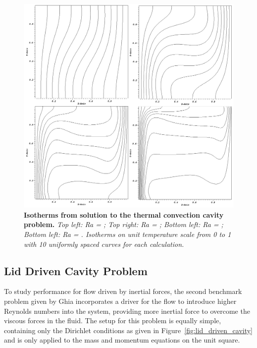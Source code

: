 \begin{figure}[t!]
  \begin{center}
    \includegraphics[width=6in]{chapters/nonlinear_problem/convection_isotherms.png}
  \end{center}
  \caption{\textbf{Isotherms from solution to the thermal convection
        cavity problem.} \textit{Top left: Ra = ; Top right:
        Ra = ; Bottom left: Ra = ; Bottom left: Ra =
        . Isotherms on unit temperature scale from 0 to 1
        with 10 uniformly spaced curves for each calculation.}}
  \label{fig:convection_isotherms}
\end{figure}

\clearpage

\subsection{Lid Driven Cavity Problem}
\label{subsec:lid_driven_cavity}
To study performance for flow driven by inertial forces, the second
benchmark problem given by Ghia \cite{ghia_high-re_1982} incorporates
a driver for the flow to introduce higher Reynolds numbers into the
system, providing more inertial force to overcome the viscous forces
in the fluid. The setup for this problem is equally simple, containing
only the Dirichlet conditions as given in
Figure~\ref{fig:lid_driven_cavity} and is only applied to the mass and
momentum equations on the unit square.

